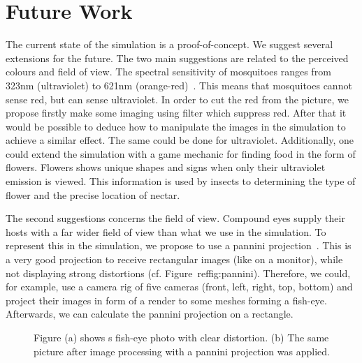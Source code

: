 \documentclass{sig-alternate-05-2015}
\begin{document}
\section{Future Work}
\label{sec:futurework}
\noindent
The current state of the simulation is a proof-of-concept. We suggest several extensions for the future. 
The two main suggestions are related to the perceived colours and field of view. The spectral sensitivity of mosquitoes ranges from 323nm (ultraviolet) to 621nm (orange-red)~\cite{muir1992}. This means that mosquitoes cannot sense red, but can sense ultraviolet. In order to cut the red from the picture, we propose firstly make some imaging using filter which suppress red. After that it would be possible to deduce how to manipulate the images in the simulation to achieve a similar effect. The same could be done for ultraviolet. Additionally, one could extend the simulation with a game mechanic for finding food in the form of flowers. Flowers shows unique shapes and signs when only their ultraviolet emission is viewed. This information is used by insects to determining the type of flower and the precise location of nectar.

The second suggestions concerns the field of view. Compound eyes supply their hosts with a far wider field of view than what we use in the simulation. To represent this in the simulation, we propose to use a pannini projection~\cite{sharpless2010}. This is a very good projection to receive rectangular images (like on a monitor), while not displaying strong distortions (cf. Figure~ref{fig:pannini}). Therefore, we could, for example, use a camera rig of five cameras (front, left, right, top, bottom) and project their images in form of a render to some meshes forming a fish-eye. Afterwards, we can calculate the pannini projection on a rectangle.

\begin{figure}[ht!]
{}

\caption{Figure (a) shows s fish-eye photo with clear distortion. (b) The same picture after image processing with a pannini projection was applied.}
\label{fig:pannini}
\end{figure}
\end{document}
